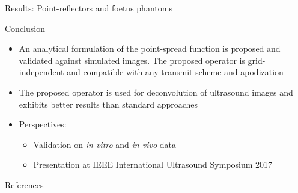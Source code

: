 {\begin{block}{Results: Point-reflectors and foetus phantoms}
\end{block}
\vfill


\begin{block}{Conclusion}
	\begin{itemize}
		\item An analytical formulation of the point-spread function is proposed and validated against simulated images. The proposed operator is grid-independent and compatible with any transmit scheme and apodization
		\item The proposed operator is used for deconvolution of ultrasound images and exhibits better results than standard approaches
		\item Perspectives:
		\begin{itemize}
			\item Validation on \textit{in-vitro} and \textit{in-vivo} data
			\item Presentation at IEEE International Ultrasound Symposium 2017
		\end{itemize}
	\end{itemize}
\end{block}
\vfill


\begin{block}{References}
	\printbibliography
\end{block}
}